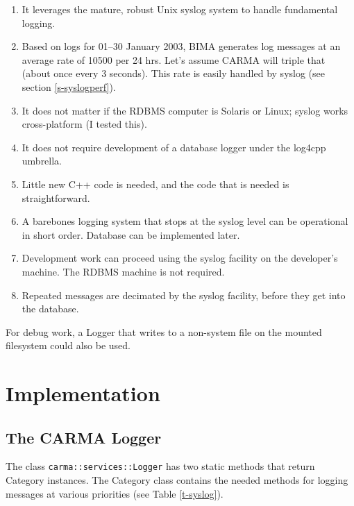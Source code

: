\documentclass[preprint]{aastex}
\begin{document}
\begin{enumerate} 
\item It leverages the mature, robust Unix syslog
system to handle fundamental logging. 

\item Based on logs for 01--30 January 2003, BIMA generates log 
messages at an average rate of 10500 per 24 hrs. Let's 
assume CARMA will triple that (about once every 3 seconds).
This rate is easily handled by syslog (see section \ref{s-syslogperf}).

\item It does not matter if the RDBMS computer is Solaris or
Linux; syslog works cross-platform (I tested this).

\item It does not require development of a database logger under
the log4cpp umbrella.

\item Little new C++ code is needed, and the code that is needed is
straightforward.

\item A barebones logging system that stops at the syslog level 
can be operational in short order.  Database can be implemented
later.

\item Development work can proceed using the syslog facility on 
the developer's machine. The RDBMS machine is not required.

\item Repeated messages are decimated by the syslog facility,
before they get into the database.

\end{enumerate}
For debug work, a Logger that writes to a non-system file on the
mounted filesystem could also be used.


\section{Implementation}
\subsection{The CARMA Logger}
The class {\tt carma::services::Logger} has two static methods
that return Category instances.  The Category class contains the
needed methods for logging messages at various priorities (see
Table \ref{t-syslog}).
\end{document}
